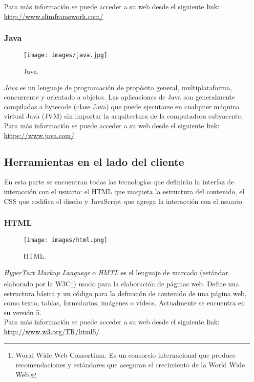 Para más información se puede acceder a su web desde el siguiente link:\\ \url{http://www.slimframework.com/}

\subsubsection*{Java}
\begin{figure}[H]
	\centering
	\texttt{[image: images/java.jpg]}
	\caption{Java.}
\end{figure}
\textit{Java} es un lenguaje de programación de propósito general, multiplataforma, concurrente y orientado a objetos. Las aplicaciones de Java son generalmente compiladas a bytecode (clase Java) que puede ejecutarse en cualquier máquina virtual Java (JVM) sin importar la arquitectura de la computadora subyacente. \\  

Para más información se puede acceder a su web desde el siguiente link:\\ \url{https://www.java.com/}

\subsection{Herramientas en el lado del cliente}
En esta parte se encuentran todas las tecnologías que definirán la interfaz de interacción con el usuario: el HTML que maqueta la estructura del contenido, el CSS que codifica el diseño y JavaScript que agrega la interacción con el usuario. 
 
\subsubsection*{HTML}
\begin{figure}[H]
	\centering
	\texttt{[image: images/html.png]}
	\caption{HTML.}
\end{figure}
\textit{HyperText Markup Language} o \textit{HMTL} es el lenguaje de marcado (estándar elaborado por la W3C\footnote{World Wide Web Consortium. Es un consorcio internacional que produce recomendaciones y estándares que aseguran el crecimiento de la World Wide Web.}) usado para la elaboración de páginas web. Define una estructura básica y un código para la definición de contenido de una página web, como texto, tablas, formularios, imágenes o vídeos. Actualmente se encuentra en su versión 5.\\  

Para más información se puede acceder a su web desde el siguiente link:\\ \url{http://www.w3.org/TR/html5/}

